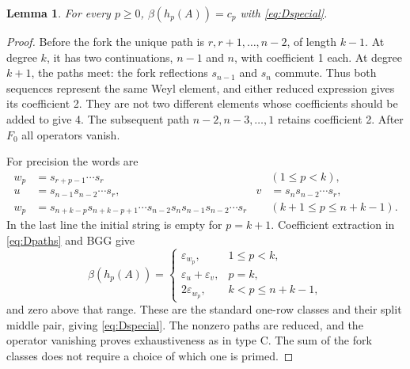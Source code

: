 \documentclass[11pt,letterpaper]{article}
\newtheorem{lemma}[theorem]{Lemma}
\theoremstyle{remark}
\newcommand{\eps}{\varepsilon}
\begin{document}
\begin{lemma}\label{lem:Drows}
For every $p\geq0$, $\beta(h_p(A))=c_p$ with \eqref{eq:Dspecial}.
\end{lemma}
\begin{proof}
Before the fork the unique path is $r,r+1,\ldots,n-2$, of length $k-1$. At degree $k$, it has two continuations, $n-1$ and $n$, with coefficient 1 each. At degree $k+1$, the paths meet: the fork reflections $s_{n-1}$ and $s_n$ commute. Thus both sequences represent the same Weyl element, and either reduced expression gives its coefficient 2. They are not two different elements whose coefficients should be added to give 4. The subsequent path $n-2,n-3,\ldots,1$ retains coefficient 2. After $F_0$ all operators vanish.

For precision the words are
\begin{align}
 w_p&=s_{r+p-1}\cdots s_r &&(1\leq p<k),\nonumber\\
 u&=s_{n-1}s_{n-2}\cdots s_r,
 &v&=s_ns_{n-2}\cdots s_r,\label{eq:Dforkwords}\\
 w_p&=s_{n+k-p}s_{n+k-p+1}\cdots s_{n-2}
       s_ns_{n-1}s_{n-2}\cdots s_r
       &&(k+1\leq p\leq n+k-1).
 \nonumber
\end{align}
In the last line the initial string is empty for $p=k+1$. Coefficient extraction in \eqref{eq:Dpaths} and BGG give
\[
 \beta(h_p(A))=
 \begin{cases}
 \eps_{w_p},&1\leq p<k,\\
 \eps_u+\eps_v,&p=k,\\
 2\eps_{w_p},&k<p\leq n+k-1,
 \end{cases}
\]
and zero above that range. These are the standard one-row classes and their split middle pair, giving \eqref{eq:Dspecial}. The nonzero paths are reduced, and the operator vanishing proves exhaustiveness as in type C. The sum of the fork classes does not require a choice of which one is primed.
\end{proof}
\end{document}
